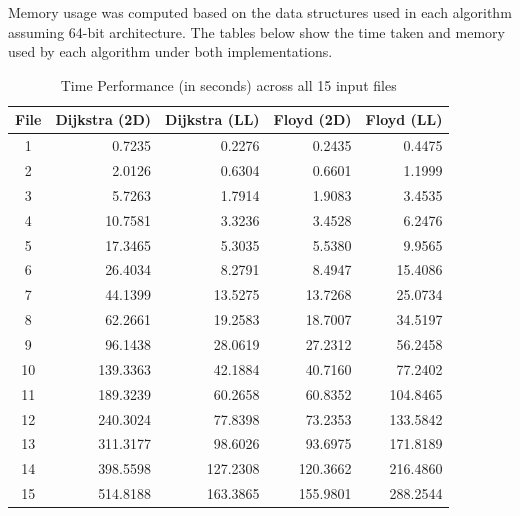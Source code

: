 \documentclass[11pt, a4paper]{article}
\begin{document}
Memory usage was computed based on the data structures used in each algorithm assuming
64-bit architecture. The tables below show the time taken and memory used by each algorithm
under both implementations.
\begin{table}[h!]
\centering
\renewcommand{\arraystretch}{1.2}
\begin{tabular}{|c|r|r|r|r|}
\hline
\textbf{File} & \textbf{Dijkstra (2D)} & \textbf{Dijkstra (LL)} & \textbf{Floyd (2D)} & \textbf{Floyd (LL)} \\
\hline
1 & 0.7235 & 0.2276 & 0.2435 & 0.4475 \\
2 & 2.0126 & 0.6304 & 0.6601 & 1.1999 \\
3 & 5.7263 & 1.7914 & 1.9083 & 3.4535 \\
4 & 10.7581 & 3.3236 & 3.4528 & 6.2476 \\
5 & 17.3465 & 5.3035 & 5.5380 & 9.9565 \\
6 & 26.4034 & 8.2791 & 8.4947 & 15.4086 \\
7 & 44.1399 & 13.5275 & 13.7268 & 25.0734 \\
8 & 62.2661 & 19.2583 & 18.7007 & 34.5197 \\
9 & 96.1438 & 28.0619 & 27.2312 & 56.2458 \\
10 & 139.3363 & 42.1884 & 40.7160 & 77.2402 \\
11 & 189.3239 & 60.2658 & 60.8352 & 104.8465 \\
12 & 240.3024 & 77.8398 & 73.2353 & 133.5842 \\
13 & 311.3177 & 98.6026 & 93.6975 & 171.8189 \\
14 & 398.5598 & 127.2308 & 120.3662 & 216.4860 \\
15 & 514.8188 & 163.3865 & 155.9801 & 288.2544 \\
\hline
\end{tabular}
\caption{Time Performance (in seconds) across all 15 input files}
\label{tab:time_perf}
\end{table}
\end{document}
